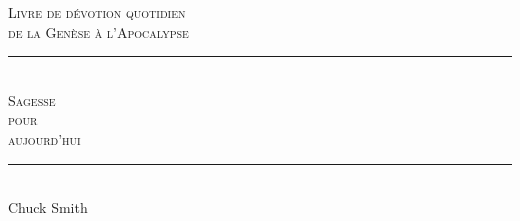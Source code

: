 
\newcommand{\HRule}{\rule{\linewidth}{0.2mm}}

\begin{titlepage}
\begin{center}
\mbox{}
\vfill
\textsc{\large Livre de dévotion quotidien\\de la Genèse à l'Apocalypse}
\\[1.5cm]
\HRule \\[0.4cm]
\textsc{ \Huge Sagesse\\ pour\\[0.4cm] aujourd'hui}\\[0.4cm]

\HRule \\[1.5cm]
{\LARGE Chuck Smith}\\[1.5cm]
\vfill
\mbox{}
\end{center}
\end{titlepage}

